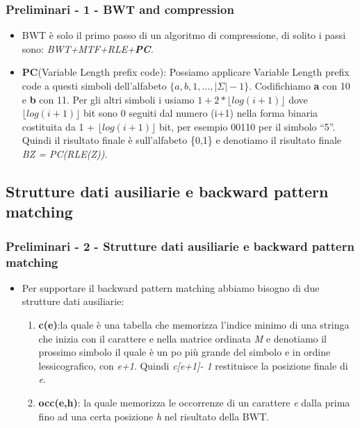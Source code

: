 \documentclass{beamer}
\begin{document}
\begin{frame}
\frametitle{Preliminari - 1 - BWT and compression}
\begin{itemize}
	\item BWT è solo il primo passo di un algoritmo di compressione, di solito i passi sono: \textit{BWT+MTF+RLE+\textbf{PC}.}\pause
	\item \textbf{PC}(Variable Length prefix code): Possiamo applicare Variable Length prefix code a questi simboli dell'alfabeto $ \{a,b,1,...,|\Sigma| -1\} $. Codifichiamo \textbf{a}  con 10 e \textbf{b}  con 11. Per gli altri simboli i usiamo $ 1+2* \lfloor log(i+1) \rfloor $  dove  $\lfloor log(i+1) \rfloor$   bit  sono 0 seguiti dal numero (i+1)  nella forma binaria costituita da 1 +  $\lfloor log(i+1) \rfloor$   bit, per esempio 00110 per il simbolo ``5''. Quindi il risultato finale è sull’alfabeto \{0,1\} e denotiamo il risultato finale \textit{BZ = PC(RLE(Z))}.
	
\end{itemize}
\end{frame}

\subsection{Strutture dati ausiliarie e backward pattern matching}

\begin{frame}
\frametitle{Preliminari - 2 - Strutture dati ausiliarie e backward pattern matching}
\begin{itemize}
	\item Per supportare il backward pattern matching abbiamo bisogno di due strutture dati ausiliarie:\pause
	\begin{enumerate}
		\item \textbf{c(e)}:la quale è una tabella che memorizza l'indice minimo di una stringa che inizia con il carattere e nella matrice ordinata \textit{M} e denotiamo il prossimo simbolo il quale è un po più grande del simbolo e  in ordine lessicografico, con \textit{e+1}. Quindi \textit{c[e+1]- 1} restituisce la posizione finale di \textit{e}.\pause
		\item \textbf{occ(e,h)}: la quale memorizza le occorrenze di un carattere \textit{e} dalla prima fino ad una certa posizione \textit{h} nel risultato della BWT. 
	\end{enumerate}
\end{itemize}
\end{frame}
\end{document}

